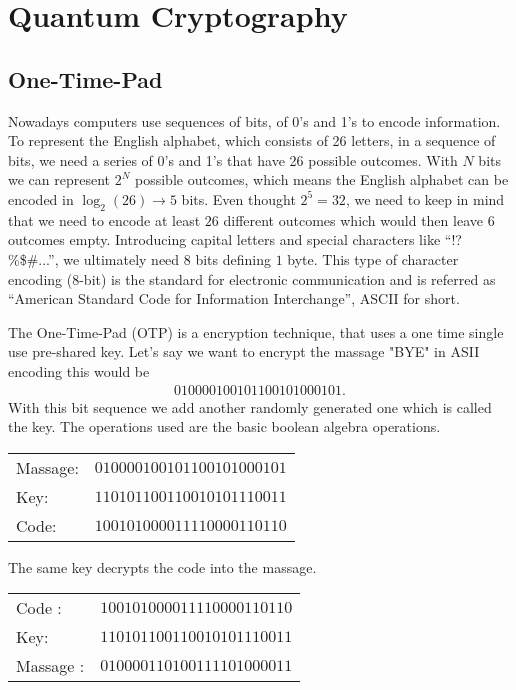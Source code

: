 \documentclass[a4paper]{article}
\begin{document}
\section{Quantum Cryptography}
\subsection{One-Time-Pad}
Nowadays computers use sequences of bits, of 0's and 1's to encode information.
To represent the English alphabet, which consists of 26 letters, in a sequence
of bits, we need a series of 0's and 1's that have 26 possible outcomes. With
$N$ bits we can represent $2^N$ possible outcomes, which means the English
alphabet can be encoded in $\log_2(26) \rightarrow 5$ bits.  Even thought $2^5
= 32$, we need to keep in mind that we need to encode at least $26$ different
outcomes which would then leave $6$ outcomes empty.  Introducing capital
letters and special characters like ``!?\%\$\#...'', we ultimately need $8$
bits defining $1$ byte. This type of character encoding ($8$-bit) is the
standard for electronic communication and is referred as ``American Standard
Code for Information Interchange'', ASCII for short.

The One-Time-Pad (OTP) is a encryption technique, that uses a one time single
use pre-shared key. Let's say we want to encrypt the massage "BYE" in ASII
encoding this would be
\begin{align}
        010000100101100101000101.
\end{align}
With this bit sequence we add another randomly generated one which is called
the key. The operations used are the basic boolean algebra operations.
\begin{table}[H]
    \centering
    \begin{tabular}{l|c}
        Massage: &  $010000100101100101000101$\\
        Key:     &  $110101100110010101110011$ \\
        \hline
        Code:   &   $100101000011110000110110$
    \end{tabular}
\end{table}
The same key decrypts the code into the massage.
\begin{table}[H]
    \centering
    \begin{tabular}{l|c}
        Code : &  $100101000011110000110110$\\
        Key:     & $110101100110010101110011$ \\
        \hline
        Massage :   & $010000110100111101000011$
    \end{tabular}
\end{table}
\end{document}
